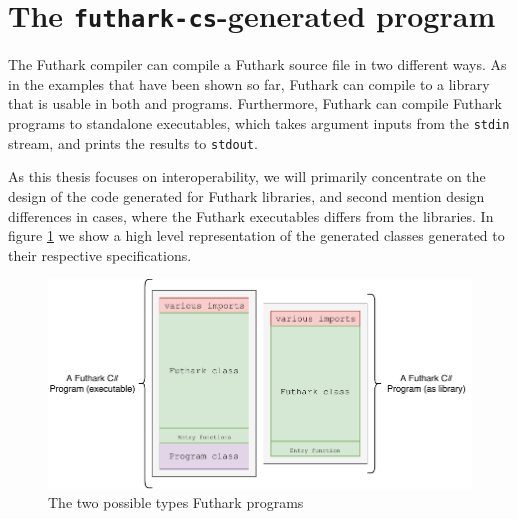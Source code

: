 \clearpage

\section{The \texttt{futhark-cs}-generated \csharp{} program}
The Futhark \csharp{} compiler can compile a Futhark source file in two
different ways. As in the examples that have been shown so far, Futhark can
compile to a library that is usable in both \csharp{} and \fsharp{} programs.
Furthermore, Futhark can compile Futhark programs to standalone executables,
which takes argument inputs from the \texttt{stdin} stream, and prints the
results to \texttt{stdout}.

As this thesis focuses on interoperability, we will primarily concentrate on the
design of the \csharp{} code generated for Futhark libraries, and second mention
design differences in cases, where the Futhark executables differs from the libraries.
In figure \ref{fig:futharkcsclasses} we show a high level representation of the
generated \csharp{} classes generated to their respective specifications.

\begin{figure}[h]
  \centering
  \includegraphics[scale=0.85]{chapters/figs/csharp/futharkcs_wide.pdf}
  \caption{The two possible types Futhark \csharp{} programs}
  \label{fig:futharkcsclasses}
\end{figure}

